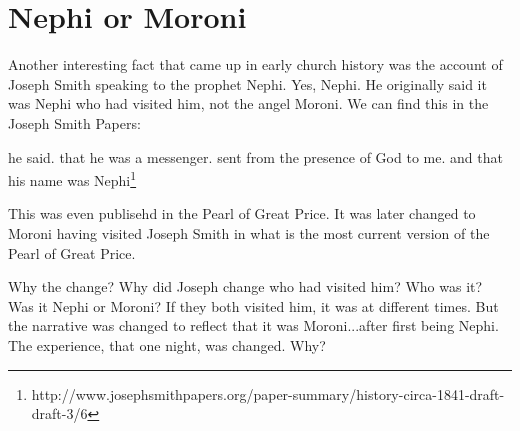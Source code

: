 \chapter{Nephi or Moroni}

Another interesting fact that came up in early church history was the account of
Joseph Smith speaking to the prophet Nephi. Yes, Nephi. He originally said it
was Nephi who had visited him, not the angel Moroni. We can find this in the
Joseph Smith Papers:

\begin{displayquote}
he said. that he was a messenger. sent from the 
presence of God to me. and that his name was Nephi\footnote{
http://www.josephsmithpapers.org/paper-summary/history-circa-1841-draft-draft-3/6
}
\end{displayquote}

This was even publisehd in the Pearl of Great Price. It was later changed to
Moroni having visited Joseph Smith in what is the most current version of the
Pearl of Great Price.

Why the change? Why did Joseph change who had visited him? Who was it? Was it
Nephi or Moroni? If they both visited him, it was at different times. But the
narrative was changed to reflect that it was Moroni...after first being Nephi.
The experience, that one night, was changed. Why?